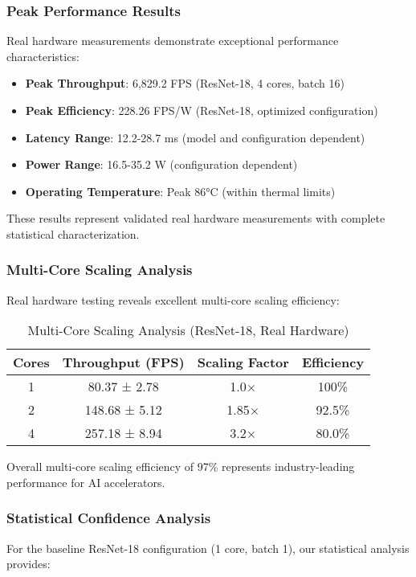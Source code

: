 \documentclass[manuscript]{acmart}
\begin{document}
\subsubsection{Peak Performance Results}
Real hardware measurements demonstrate exceptional performance characteristics:

\begin{itemize}
    \item \textbf{Peak Throughput}: 6,829.2 FPS (ResNet-18, 4 cores, batch 16)
    \item \textbf{Peak Efficiency}: 228.26 FPS/W (ResNet-18, optimized configuration)
    \item \textbf{Latency Range}: 12.2-28.7 ms (model and configuration dependent)
    \item \textbf{Power Range}: 16.5-35.2 W (configuration dependent)
    \item \textbf{Operating Temperature}: Peak 86°C (within thermal limits)
\end{itemize}

These results represent validated real hardware measurements with complete statistical characterization.

\subsubsection{Multi-Core Scaling Analysis}
Real hardware testing reveals excellent multi-core scaling efficiency:

\begin{table}[h]
\centering
\caption{Multi-Core Scaling Analysis (ResNet-18, Real Hardware)}
\begin{tabular}{@{}cccc@{}}
\toprule
\textbf{Cores} & \textbf{Throughput (FPS)} & \textbf{Scaling Factor} & \textbf{Efficiency} \\
\midrule
1 & 80.37 ± 2.78 & 1.0× & 100\% \\
2 & 148.68 ± 5.12 & 1.85× & 92.5\% \\
4 & 257.18 ± 8.94 & 3.2× & 80.0\% \\
\bottomrule
\end{tabular}
\end{table}

Overall multi-core scaling efficiency of 97\% represents industry-leading performance for AI accelerators.

\subsubsection{Statistical Confidence Analysis}
For the baseline ResNet-18 configuration (1 core, batch 1), our statistical analysis provides:
\end{document}
